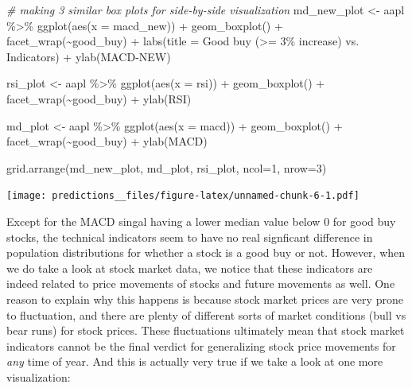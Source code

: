 \documentclass[
]{article}
\newenvironment{Shaded}{\begin{snugshade}}{\end{snugshade}}
\newcommand{\AttributeTok}[1]{\textcolor[rgb]{0.77,0.63,0.00}{#1}}
\newcommand{\CommentTok}[1]{\textcolor[rgb]{0.56,0.35,0.01}{\textit{#1}}}
\newcommand{\DecValTok}[1]{\textcolor[rgb]{0.00,0.00,0.81}{#1}}
\newcommand{\FunctionTok}[1]{\textcolor[rgb]{0.00,0.00,0.00}{#1}}
\newcommand{\NormalTok}[1]{#1}
\newcommand{\OtherTok}[1]{\textcolor[rgb]{0.56,0.35,0.01}{#1}}
\newcommand{\SpecialCharTok}[1]{\textcolor[rgb]{0.00,0.00,0.00}{#1}}
\newcommand{\StringTok}[1]{\textcolor[rgb]{0.31,0.60,0.02}{#1}}
\begin{document}
\begin{Shaded}
\begin{Highlighting}[]
\CommentTok{\# making 3 similar box plots for side{-}by{-}side visualization }
\NormalTok{md\_new\_plot }\OtherTok{\textless{}{-}}\NormalTok{ aapl }\SpecialCharTok{\%\textgreater{}\%}
  \FunctionTok{ggplot}\NormalTok{(}\FunctionTok{aes}\NormalTok{(}\AttributeTok{x =}\NormalTok{ macd\_new)) }\SpecialCharTok{+} 
  \FunctionTok{geom\_boxplot}\NormalTok{() }\SpecialCharTok{+}
  \FunctionTok{facet\_wrap}\NormalTok{(}\SpecialCharTok{\textasciitilde{}}\NormalTok{good\_buy) }\SpecialCharTok{+}
  \FunctionTok{labs}\NormalTok{(}\AttributeTok{title =} \StringTok{\textquotesingle{}Good buy (\textgreater{}= 3\% increase) vs. Indicators\textquotesingle{}}\NormalTok{) }\SpecialCharTok{+} 
  \FunctionTok{ylab}\NormalTok{(}\StringTok{\textquotesingle{}MACD{-}NEW\textquotesingle{}}\NormalTok{)}

\NormalTok{rsi\_plot }\OtherTok{\textless{}{-}}\NormalTok{ aapl }\SpecialCharTok{\%\textgreater{}\%}
  \FunctionTok{ggplot}\NormalTok{(}\FunctionTok{aes}\NormalTok{(}\AttributeTok{x =}\NormalTok{ rsi)) }\SpecialCharTok{+}
  \FunctionTok{geom\_boxplot}\NormalTok{() }\SpecialCharTok{+}
  \FunctionTok{facet\_wrap}\NormalTok{(}\SpecialCharTok{\textasciitilde{}}\NormalTok{good\_buy) }\SpecialCharTok{+} 
  \FunctionTok{ylab}\NormalTok{(}\StringTok{\textquotesingle{}RSI\textquotesingle{}}\NormalTok{)}

\NormalTok{md\_plot }\OtherTok{\textless{}{-}}\NormalTok{ aapl }\SpecialCharTok{\%\textgreater{}\%}
  \FunctionTok{ggplot}\NormalTok{(}\FunctionTok{aes}\NormalTok{(}\AttributeTok{x =}\NormalTok{ macd)) }\SpecialCharTok{+}
  \FunctionTok{geom\_boxplot}\NormalTok{() }\SpecialCharTok{+}
  \FunctionTok{facet\_wrap}\NormalTok{(}\SpecialCharTok{\textasciitilde{}}\NormalTok{good\_buy) }\SpecialCharTok{+} 
  \FunctionTok{ylab}\NormalTok{(}\StringTok{\textquotesingle{}MACD\textquotesingle{}}\NormalTok{)}

\FunctionTok{grid.arrange}\NormalTok{(md\_new\_plot, md\_plot, rsi\_plot, }\AttributeTok{ncol=}\DecValTok{1}\NormalTok{, }\AttributeTok{nrow=}\DecValTok{3}\NormalTok{)}
\end{Highlighting}
\end{Shaded}

\texttt{[image: predictions\_\_files/figure-latex/unnamed-chunk-6-1.pdf]}

Except for the MACD singal having a lower median value below 0 for good
buy stocks, the technical indicators seem to have no real signficant
difference in population distributions for whether a stock is a good buy
or not. However, when we do take a look at stock market data, we notice
that these indicators are indeed related to price movements of stocks
and future movements as well. One reason to explain why this happens is
because stock market prices are very prone to fluctuation, and there are
plenty of different sorts of market conditions (bull vs bear runs) for
stock prices. These fluctuations ultimately mean that stock market
indicators cannot be the final verdict for generalizing stock price
movements for \emph{any} time of year. And this is actually very true if
we take a look at one more visualization:
\end{document}
